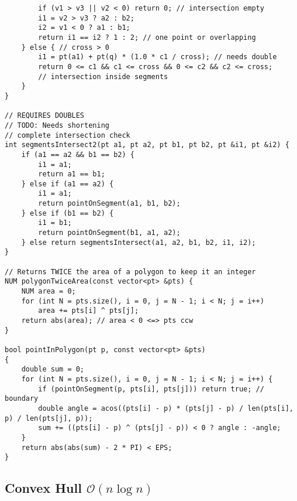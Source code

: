 \documentclass{article}
\begin{document}
\begin{lstlisting}
		if (v1 > v3 || v2 < 0) return 0; // intersection empty
		i1 = v2 > v3 ? a2 : b2;
		i2 = v1 < 0 ? a1 : b1;
		return i1 == i2 ? 1 : 2; // one point or overlapping
	} else { // cross > 0
		i1 = pt(a1) + pt(q) * (1.0 * c1 / cross); // needs double
		return 0 <= c1 && c1 <= cross && 0 <= c2 && c2 <= cross;
		// intersection inside segments
	}
}

// REQUIRES DOUBLES
// TODO: Needs shortening
// complete intersection check
int segmentsIntersect2(pt a1, pt a2, pt b1, pt b2, pt &i1, pt &i2) {
	if (a1 == a2 && b1 == b2) {
		i1 = a1;
		return a1 == b1;
	} else if (a1 == a2) {
		i1 = a1;
		return pointOnSegment(a1, b1, b2);
	} else if (b1 == b2) {
		i1 = b1;
		return pointOnSegment(b1, a1, a2);
	} else return segmentsIntersect(a1, a2, b1, b2, i1, i2);
}

// Returns TWICE the area of a polygon to keep it an integer
NUM polygonTwiceArea(const vector<pt> &pts) {
	NUM area = 0;
	for (int N = pts.size(), i = 0, j = N - 1; i < N; j = i++)
		area += pts[i] ^ pts[j];
	return abs(area); // area < 0 <=> pts ccw
}

bool pointInPolygon(pt p, const vector<pt> &pts)
{
    double sum = 0;
    for (int N = pts.size(), i = 0, j = N - 1; i < N; j = i++) {
		if (pointOnSegment(p, pts[i], pts[j])) return true; // boundary
		double angle = acos((pts[i] - p) * (pts[j] - p) / len(pts[i], p) / len(pts[j], p));
        sum += ((pts[i] - p) ^ (pts[j] - p)) < 0 ? angle : -angle;
    }
    return abs(abs(sum) - 2 * PI) < EPS;
}
\end{lstlisting}

\begin{comment}
// Assumption: polygon has unique points
// 0: no, 1: yes, 2: on boundary
int pointInConvex(pt p, const vector<pt> &pts) {
bool onBoundary = false;
for (int N = pts.size(), sgn = 0, i = 0, j = N - 1; i < N; j = i++) {
NUM cross = (pts[i] - p) ^ (pts[j] - p);
int s = (cross > 0) - (cross < 0);
if (cross == 0) onBoundary = true;
else if (sgn == 0) sgn = s;
else if (sgn != s) return 0;
}
return onBoundary ? 2 : 1;
}
\end{comment}

\subsection{Convex Hull $\mathcal{O}(n \log n)$}
\end{document}
